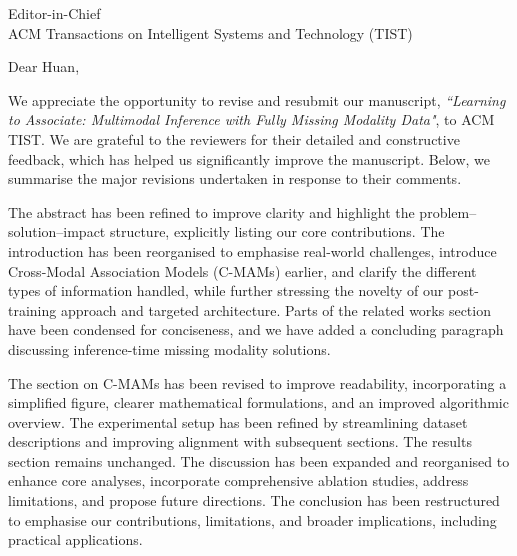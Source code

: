 \documentclass[a4paper,12pt]{letter}
\begin{document}
\begin{letter}{Editor-in-Chief\\ACM Transactions on Intelligent Systems and Technology (TIST)}

\opening{Dear Huan,}

We appreciate the opportunity to revise and resubmit our manuscript, \emph{``Learning to Associate: Multimodal Inference with Fully Missing Modality Data"}, to ACM TIST. We are grateful to the reviewers for their detailed and constructive feedback, which has helped us significantly improve the manuscript. Below, we summarise the major revisions undertaken in response to their comments.

The abstract has been refined to improve clarity and highlight the problem--solution--impact structure, explicitly listing our core contributions. The introduction has been reorganised to emphasise real-world challenges, introduce Cross-Modal Association Models (C-MAMs) earlier, and clarify the different types of information handled, while further stressing the novelty of our post-training approach and targeted architecture. Parts of the related works section have been condensed for conciseness, and we have added a concluding paragraph discussing inference-time missing modality solutions.

The section on C-MAMs has been revised to improve readability, incorporating a simplified figure, clearer mathematical formulations, and an improved algorithmic overview. The experimental setup has been refined by streamlining dataset descriptions and improving alignment with subsequent sections. The results section remains unchanged. The discussion has been expanded and reorganised to enhance core analyses, incorporate comprehensive ablation studies, address limitations, and propose future directions. The conclusion has been restructured to emphasise our contributions, limitations, and broader implications, including practical applications.


\end{letter}
\end{document}
